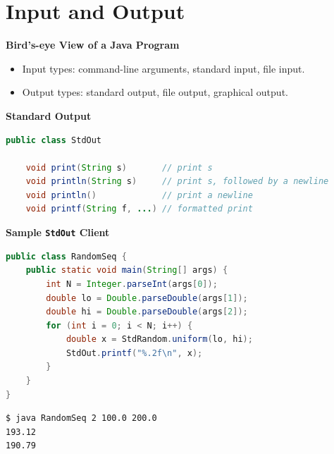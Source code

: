 \documentclass[8pt,a4paper,compress]{beamer}
\begin{document}
\section{Input and Output}
\begin{frame}[fragile]
\pause

\textbf{Bird's-eye View of a Java Program}
\begin{center}
\end{center}
\begin{itemize}
\item Input types: command-line arguments, standard input, file input.
\item Output types: standard output, file output, graphical output.
\end{itemize}

\pause
\smallskip

\textbf{Standard Output}

\begin{lstlisting}[language=Java]
public class StdOut

    void print(String s)       // print s
    void println(String s)     // print s, followed by a newline
    void println()             // print a newline
    void printf(String f, ...) // formatted print
\end{lstlisting}

\pause
\smallskip

\textbf{Sample \lstinline$StdOut$ Client}

\begin{lstlisting}[language=Java]
public class RandomSeq {
    public static void main(String[] args) { 
        int N = Integer.parseInt(args[0]);
        double lo = Double.parseDouble(args[1]);
        double hi = Double.parseDouble(args[2]);
        for (int i = 0; i < N; i++) {
            double x = StdRandom.uniform(lo, hi);
            StdOut.printf("%.2f\n", x);
        }
    }
}
\end{lstlisting}

\pause

\begin{lstlisting}[language=bash]
$ java RandomSeq 2 100.0 200.0
193.12
190.79
\end{lstlisting}
\end{frame}
\end{document}
